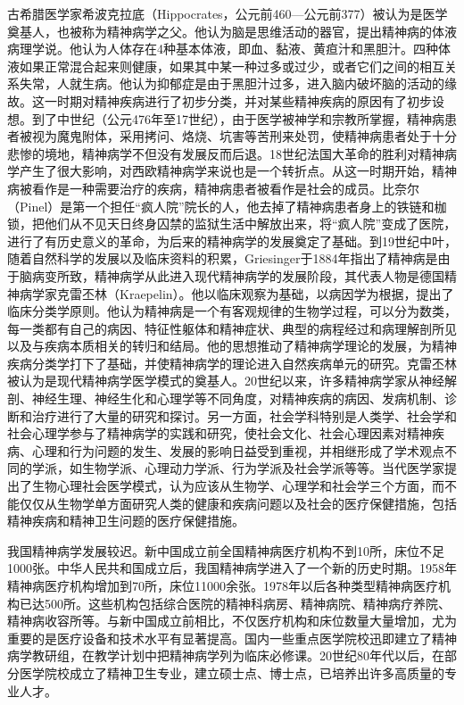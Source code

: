 古希腊医学家希波克拉底（Hippocrates，公元前460---公元前377）被认为是医学奠基人，也被称为精神病学之父。他认为脑是思维活动的器官，提出精神病的体液病理学说。他认为人体存在4种基本体液，即血、黏液、黄疸汁和黑胆汁。四种体液如果正常混合起来则健康，如果其中某一种过多或过少，或者它们之间的相互关系失常，人就生病。他认为抑郁症是由于黑胆汁过多，进入脑内破坏脑的活动的缘故。这一时期对精神疾病进行了初步分类，并对某些精神疾病的原因有了初步设想。到了中世纪（公元476年至17世纪），由于医学被神学和宗教所掌握，精神病患者被视为魔鬼附体，采用拷问、烙烧、坑害等苦刑来处罚，使精神病患者处于十分悲惨的境地，精神病学不但没有发展反而后退。18世纪法国大革命的胜利对精神病学产生了很大影响，对西欧精神病学来说也是一个转折点。从这一时期开始，精神病被看作是一种需要治疗的疾病，精神病患者被看作是社会的成员。比奈尔（Pinel）是第一个担任“疯人院”院长的人，他去掉了精神病患者身上的铁链和枷锁，把他们从不见天日终身囚禁的监狱生活中解放出来，将“疯人院”变成了医院，进行了有历史意义的革命，为后来的精神病学的发展奠定了基础。到19世纪中叶，随着自然科学的发展以及临床资料的积累，Griesinger于1884年指出了精神病是由于脑病变所致，精神病学从此进入现代精神病学的发展阶段，其代表人物是德国精神病学家克雷丕林（Kraepelin）。他以临床观察为基础，以病因学为根据，提出了临床分类学原则。他认为精神病是一个有客观规律的生物学过程，可以分为数类，每一类都有自己的病因、特征性躯体和精神症状、典型的病程经过和病理解剖所见以及与疾病本质相关的转归和结局。他的思想推动了精神病学理论的发展，为精神疾病分类学打下了基础，并使精神病学的理论进入自然疾病单元的研究。克雷丕林被认为是现代精神病学医学模式的奠基人。20世纪以来，许多精神病学家从神经解剖、神经生理、神经生化和心理学等不同角度，对精神疾病的病因、发病机制、诊断和治疗进行了大量的研究和探讨。另一方面，社会学科特别是人类学、社会学和社会心理学参与了精神病学的实践和研究，使社会文化、社会心理因素对精神疾病、心理和行为问题的发生、发展的影响日益受到重视，并相继形成了学术观点不同的学派，如生物学派、心理动力学派、行为学派及社会学派等等。当代医学家提出了生物心理社会医学模式，认为应该从生物学、心理学和社会学三个方面，而不能仅仅从生物学单方面研究人类的健康和疾病问题以及社会的医疗保健措施，包括精神疾病和精神卫生问题的医疗保健措施。

我国精神病学发展较迟。新中国成立前全国精神病医疗机构不到10所，床位不足1000张。中华人民共和国成立后，我国精神病学进入了一个新的历史时期。1958年精神病医疗机构增加到70所，床位11000余张。1978年以后各种类型精神病医疗机构已达500所。这些机构包括综合医院的精神科病房、精神病院、精神病疗养院、精神病收容所等。与新中国成立前相比，不仅医疗机构和床位数量大量增加，尤为重要的是医疗设备和技术水平有显著提高。国内一些重点医学院校迅即建立了精神病学教研组，在教学计划中把精神病学列为临床必修课。20世纪80年代以后，在部分医学院校成立了精神卫生专业，建立硕士点、博士点，已培养出许多高质量的专业人才。

